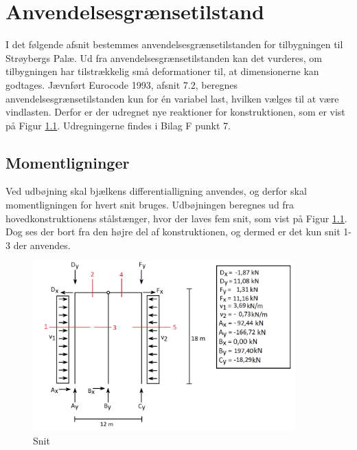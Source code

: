 \chapter{Anvendelsesgrænsetilstand}
I det følgende afsnit bestemmes anvendelsesgrænsetilstanden for tilbygningen til Strøybergs Palæ. Ud fra anvendelsesgrænsetilstanden kan det vurderes, om tilbygningen har tilstrækkelig små deformationer til, at dimensionerne kan godtages. 
\newline \indent{     }  Jævnført Eurocode 1993, afsnit 7.2, beregnes anvendelsesgrænsetilstanden kun for én variabel last, hvilken vælges til at være vindlasten. Derfor er der udregnet nye reaktioner for konstruktionen, som er vist på Figur \ref{fig:snitanvendelse}. Udregningerne findes i Bilag F punkt 7. 

\section{Momentligninger}
Ved udbøjning skal bjælkens differentialligning anvendes, og derfor skal momentligningen for hvert snit bruges. Udbøjningen beregnes ud fra hovedkonstruktionens stålstænger, hvor der laves fem snit, som vist på Figur \ref{fig:snitanvendelse}. Dog ses der bort fra den højre del af konstruktionen, og dermed er det kun snit 1-3 der anvendes.

\begin{figure}[H]
	\centering
	\includegraphics[width=0.9\textwidth]{billeder/snitanvendelse.png}
	\caption{Snit}
	\label{fig:snitanvendelse}
\end{figure}

